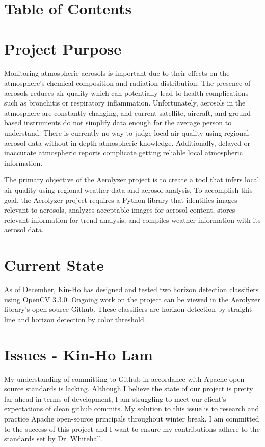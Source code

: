 \documentclass[onecolumn, draftclsnofoot,10pt, compsoc]{IEEEtran}
\begin{document}
\section{Table of Contents}
\tableofcontents


\clearpage

\begin{singlespace}

	\section{Project Purpose}
		Monitoring atmospheric aerosols is important due to their effects on the atmosphere's chemical composition and radiation distribution.
		The presence of aerosols reduces air quality which can potentially lead to health complications such as bronchitis or respiratory inflammation.
		Unfortunately, aerosols in the atmosphere are constantly changing, and current satellite, aircraft, and ground-based instruments do not simplify data enough for the average person to understand.
		There is currently no way to judge local air quality using regional aerosol data without in-depth atmospheric knowledge.
		Additionally, delayed or inaccurate atmospheric reports complicate getting reliable local atmospheric information.


		The primary objective of the Aerolyzer project is to create a tool that infers local air quality using regional weather data and aerosol analysis.
		To accomplish this goal, the Aerolyzer project requires a Python library that identifies images relevant to aerosols, analyzes acceptable images for aerosol content, stores relevant information for trend analysis, and compiles weather information with its aerosol data.
		
	\section{Current State}
		As of December, Kin-Ho has designed and tested two horizon detection classifiers using OpenCV 3.3.0.
		Ongoing work on the project can be viewed in the Aerolyzer library’s open-source Github.
		These classifiers are horizon detection by straight line and horizon detection by color threshold.

	\section{Issues - Kin-Ho Lam}
		My understanding of committing to Github in accordance with Apache open-source standards is lacking.
		Although I believe the state of our project is pretty far ahead in terms of development, I am struggling to meet our client's expectations of clean github commits.
		My solution to this issue is to research and practice Apache open-source principals throughout winter break.
		I am committed to the success of this project and I want to ensure my contributions adhere to the standards set by Dr. Whitehall.
		

\end{singlespace}
\end{document}
